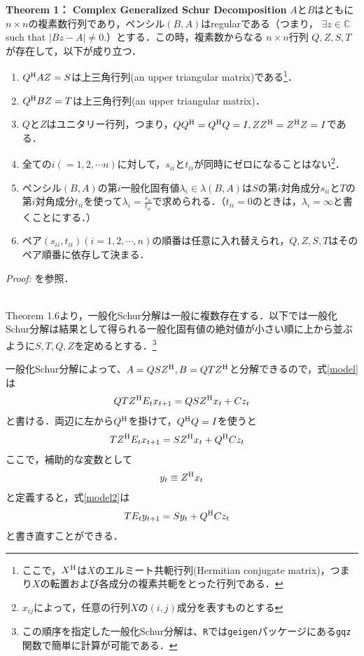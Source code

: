 \documentclass[a4j, dvipdfmx]{jarticle}
\begin{document}
\begin{itembox}[l]{{\bf Theorem 1： Complex Generalized Schur Decomposition}}
$A$と$B$はともに$n\times n$の複素数行列であり，ペンシル$(B,A)$はregularである（つまり， $\exists z\in\mathbb{C}$ such that $|Bz-A|\not=0.$）とする．この時，複素数からなる $n\times n$行列 $Q, Z, S, T$が存在して，以下が成り立つ．
\begin{enumerate}
\item $Q^{\rm{H}}AZ=S$は上三角行列(an upper triangular matrix)である\footnote{ここで，$X^{\rm{H}}$は$X$のエルミート共軛行列(Hermitian conjugate matrix)，つまり$X$の転置および各成分の複素共軛をとった行列である．}．
\item $Q^{\rm{H}}BZ=T$は上三角行列(an upper triangular matrix)．
\item $Q$と$Z$はユニタリー行列，つまり，$QQ^{\rm{H}} = Q^{\rm{H}} Q = I, ZZ^{\rm{H}} = Z^{\rm{H}} Z=I$である．
\item 全ての$i (= 1, 2, \cdots n)$に対して，$s_{ii}$と$t_{ii}$が同時にゼロになることはない\footnote{$x_{ij}$によって，任意の行列$X$の$(i,j)$成分を表すものとする}．
\item ペンシル$(B,A)$の第$i$一般化固有値$\lambda_{i}\in\lambda (B,A)$は$S$の第$i$対角成分$s_{ii}$と$T$の第$i$対角成分$t_{ii}$を使って$\lambda_i=\frac{s_{ii}}{t_{ii}}$で求められる．（$t_{ii} = 0$のときは，$\lambda_i = \infty$と書くことにする．）
\item ペア$(s_{ii}, t_{ii}) (i=1,2,\cdots, n)$の順番は任意に入れ替えられ，$Q, Z, S, T$はそのペア順番に依存して決まる．
\end{enumerate}

{\it Proof:} \citet{golub2012}を参照． 
\end{itembox}
\\

Theorem 1.6より，一般化Schur分解は一般に複数存在する．以下では一般化Schur分解は結果として得られる一般化固有値の絶対値が小さい順に上から並ぶように$S,T,Q,Z$を定めるとする．\footnote{この順序を指定した一般化Schur分解は、{\tt R}では{\tt geigen}パッケージにある{\tt gqz}関数で簡単に計算が可能である．}

一般化Schur分解によって、$A = QSZ^{\rm{H}}, B = QTZ^{\rm{H}}$と分解できるので，式\eqref{model}は
\begin{align*}
Q TZ^{\rm{H}} E_tx_{t+1} = Q SZ^{\rm{H}} x_t + C z_t
\end{align*}
と書ける．両辺に左から$Q^{\rm{H}}$を掛けて，$Q^{\rm{H}}Q = I$を使うと
\begin{align}
&TZ^{\rm{H}} E_tx_{t+1} = SZ^{\rm{H}} x_t + Q^{\rm{H}}Cz_t \label{model2}
\end{align}
ここで，補助的な変数として
\begin{align}
y_t \equiv Z^{\rm{H}}x_t \label{defy}
\end{align}
と定義すると，式\eqref{model2}は
\begin{align}
&T E_ty_{t+1} = Sy_t + Q^{\rm{H}}Cz_t \label{model3}
\end{align}
と書き直すことができる．
\end{document}
